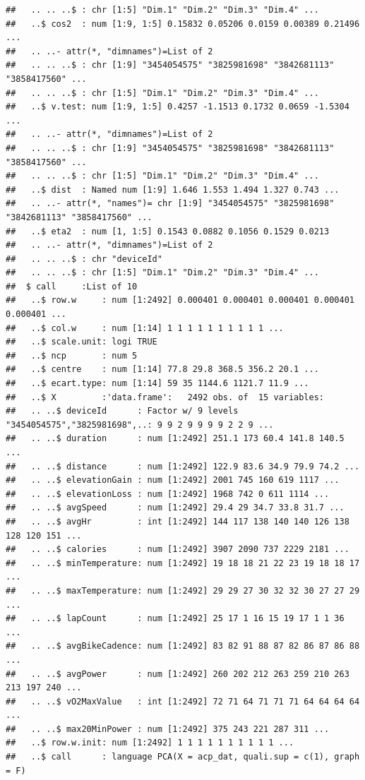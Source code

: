 \documentclass[
]{book}
\begin{document}
\begin{verbatim}
##   .. .. ..$ : chr [1:5] "Dim.1" "Dim.2" "Dim.3" "Dim.4" ...
##   ..$ cos2  : num [1:9, 1:5] 0.15832 0.05206 0.0159 0.00389 0.21496 ...
##   .. ..- attr(*, "dimnames")=List of 2
##   .. .. ..$ : chr [1:9] "3454054575" "3825981698" "3842681113" "3858417560" ...
##   .. .. ..$ : chr [1:5] "Dim.1" "Dim.2" "Dim.3" "Dim.4" ...
##   ..$ v.test: num [1:9, 1:5] 0.4257 -1.1513 0.1732 0.0659 -1.5304 ...
##   .. ..- attr(*, "dimnames")=List of 2
##   .. .. ..$ : chr [1:9] "3454054575" "3825981698" "3842681113" "3858417560" ...
##   .. .. ..$ : chr [1:5] "Dim.1" "Dim.2" "Dim.3" "Dim.4" ...
##   ..$ dist  : Named num [1:9] 1.646 1.553 1.494 1.327 0.743 ...
##   .. ..- attr(*, "names")= chr [1:9] "3454054575" "3825981698" "3842681113" "3858417560" ...
##   ..$ eta2  : num [1, 1:5] 0.1543 0.0882 0.1056 0.1529 0.0213
##   .. ..- attr(*, "dimnames")=List of 2
##   .. .. ..$ : chr "deviceId"
##   .. .. ..$ : chr [1:5] "Dim.1" "Dim.2" "Dim.3" "Dim.4" ...
##  $ call     :List of 10
##   ..$ row.w     : num [1:2492] 0.000401 0.000401 0.000401 0.000401 0.000401 ...
##   ..$ col.w     : num [1:14] 1 1 1 1 1 1 1 1 1 1 ...
##   ..$ scale.unit: logi TRUE
##   ..$ ncp       : num 5
##   ..$ centre    : num [1:14] 77.8 29.8 368.5 356.2 20.1 ...
##   ..$ ecart.type: num [1:14] 59 35 1144.6 1121.7 11.9 ...
##   ..$ X         :'data.frame':	2492 obs. of  15 variables:
##   .. ..$ deviceId      : Factor w/ 9 levels "3454054575","3825981698",..: 9 9 2 9 9 9 9 2 2 9 ...
##   .. ..$ duration      : num [1:2492] 251.1 173 60.4 141.8 140.5 ...
##   .. ..$ distance      : num [1:2492] 122.9 83.6 34.9 79.9 74.2 ...
##   .. ..$ elevationGain : num [1:2492] 2001 745 160 619 1117 ...
##   .. ..$ elevationLoss : num [1:2492] 1968 742 0 611 1114 ...
##   .. ..$ avgSpeed      : num [1:2492] 29.4 29 34.7 33.8 31.7 ...
##   .. ..$ avgHr         : int [1:2492] 144 117 138 140 140 126 138 128 120 151 ...
##   .. ..$ calories      : num [1:2492] 3907 2090 737 2229 2181 ...
##   .. ..$ minTemperature: num [1:2492] 19 18 18 21 22 23 19 18 18 17 ...
##   .. ..$ maxTemperature: num [1:2492] 29 29 27 30 32 32 30 27 27 29 ...
##   .. ..$ lapCount      : num [1:2492] 25 17 1 16 15 19 17 1 1 36 ...
##   .. ..$ avgBikeCadence: num [1:2492] 83 82 91 88 87 82 86 87 86 88 ...
##   .. ..$ avgPower      : num [1:2492] 260 202 212 263 259 210 263 213 197 240 ...
##   .. ..$ vO2MaxValue   : int [1:2492] 72 71 64 71 71 71 64 64 64 64 ...
##   .. ..$ max20MinPower : num [1:2492] 375 243 221 287 311 ...
##   ..$ row.w.init: num [1:2492] 1 1 1 1 1 1 1 1 1 1 ...
##   ..$ call      : language PCA(X = acp_dat, quali.sup = c(1), graph = F)

\end{verbatim}
\end{document}

